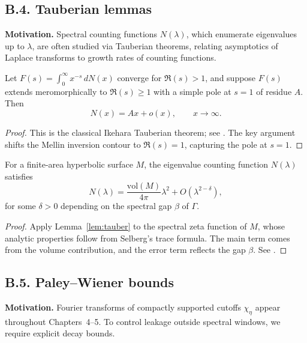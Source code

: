 \subsection*{B.4. Tauberian lemmas}

\noindent
\textbf{Motivation.}
Spectral counting functions $N(\lambda)$, which enumerate eigenvalues up to $\lambda$,
are often studied via Tauberian theorems, relating asymptotics of Laplace transforms
to growth rates of counting functions.

\begin{lemma}\label{lem:tauber}
Let $F(s)=\int_0^\infty x^{-s}\,dN(x)$ converge for $\Re(s)>1$, and suppose $F(s)$
extends meromorphically to $\Re(s)\ge 1$ with a simple pole at $s=1$ of residue $A$.
Then
\[
N(x) = Ax + o(x), \qquad x\to\infty.
\]
\end{lemma}

\begin{proof}
This is the classical Ikehara Tauberian theorem; see \cite[Chap.~III.5]{Tenenbaum2015}.
The key argument shifts the Mellin inversion contour to $\Re(s)=1$, capturing the pole at $s=1$.
\end{proof}

\begin{corollary}\label{cor:weyl-explicit}
For a finite-area hyperbolic surface $M$, the eigenvalue counting function
$N(\lambda)$ satisfies
\[
N(\lambda) = \frac{\mathrm{vol}(M)}{4\pi}\lambda^2 + O(\lambda^{2-\delta}),
\]
for some $\delta>0$ depending on the spectral gap $\beta$ of $\Gamma$.
\end{corollary}

\begin{proof}
Apply Lemma~\ref{lem:tauber} to the spectral zeta function of $M$, whose analytic properties
follow from Selberg’s trace formula. The main term comes from the volume contribution,
and the error term reflects the gap $\beta$. See \cite{Iwaniec2002, Sarnak2007}.
\end{proof}

\subsection*{B.5. Paley–Wiener bounds}

\noindent
\textbf{Motivation.}
Fourier transforms of compactly supported cutoffs $\chi_\eta$ appear throughout Chapters~4--5.
To control leakage outside spectral windows, we require explicit decay bounds.

